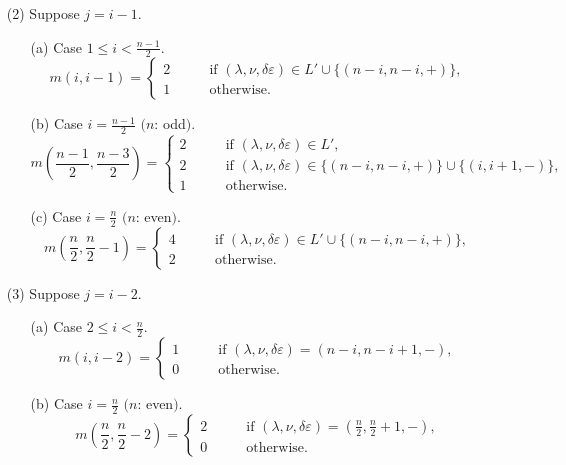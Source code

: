 \begin{theorem}
\begin{enumerate}
\item[{\rm{(2)}}]
Suppose $j=i-1$.  
\begin{enumerate}
\item[{\rm{(a)}}]
Case $1 \le i < \frac{n-1}{2}$.
\begin{equation*}
m(i,i-1)
=
\begin{cases}
2
\qquad
&\text{if }
(\lambda, \nu, \delta\varepsilon) \in L' \cup \{(n-i,n-i,+)\}, 
\\
1
&
\text{otherwise.}
\end{cases}
\end{equation*}
\item[{\rm{(b)}}]
Case $i = \frac{n-1}{2}$ $($$n$: odd$)$.  
\begin{equation*}
m(\frac{n-1}{2},\frac{n-3}{2})
=
\begin{cases}
2
\qquad
&\text{if }
(\lambda, \nu, \delta \varepsilon) \in L',  
\\
2
\qquad
&\text{if }
(\lambda, \nu, \delta \varepsilon) \in \{(n-i,n-i,+)\}
                                       \cup \{(i,i+1,-)\} ,  
\\
1 
&
\text{otherwise}.  
\end{cases}
\end{equation*}
\item[{\rm{(c)}}]
Case $i= \frac n 2$ $($$n$: even$)$.   
\begin{equation*}
m(\frac n 2,\frac n 2-1)
=
\begin{cases}
4
\qquad
&\text{if }
(\lambda, \nu, \delta\varepsilon) \in L' \cup \{(n-i,n-i,+)\},   
\\
2
&
\text{otherwise}.  
\end{cases}
\end{equation*}
\end{enumerate}

\item[{\rm{(3)}}]
Suppose $j=i-2$.  
\begin{enumerate}
\item[{\rm{(a)}}]
Case $2 \le i < \frac{n}{2}$.
\begin{equation*}
m(i,i-2)
=
\begin{cases}
1
\qquad
&\text{if }
(\lambda, \nu, \delta\varepsilon) = (n-i,n-i+1,-), 
\\
0
&
\text{otherwise.}
\end{cases}
\end{equation*}
\item[{\rm{(b)}}]
Case $i = \frac{n}{2}$ $($$n$: even$)$.  
\begin{equation*}
m(\frac{n}{2},\frac{n}{2}-2)
=
\begin{cases}
2
\qquad
&\text{if }
(\lambda, \nu, \delta \varepsilon) =(\frac{n}{2},\frac{n}{2}+1,-),  
\\
0 
&
\text{otherwise}.  
\end{cases}
\end{equation*}
\end{enumerate}


\end{enumerate}
\end{theorem}
